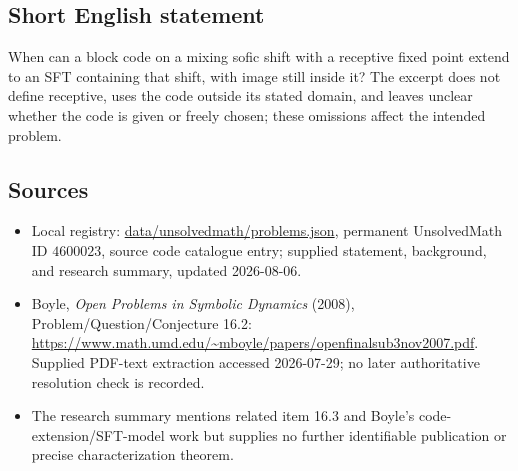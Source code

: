 \documentclass[11pt]{article}
\begin{document}
\subsection{Short English statement}
When can a block code on a mixing sofic shift with a receptive fixed point extend to an SFT containing that shift, with image still inside it? The excerpt does not define receptive, uses the code outside its stated domain, and leaves unclear whether the code is given or freely chosen; these omissions affect the intended problem.
\subsection{Sources}
\begin{itemize}
\item Local registry: \url{data/unsolvedmath/problems.json}, permanent UnsolvedMath ID \(4600023\), source code catalogue entry; supplied statement, background, and research summary, updated 2026-08-06.
\item Boyle, \emph{Open Problems in Symbolic Dynamics} (2008), Problem/Question/Conjecture 16.2: \url{https://www.math.umd.edu/~mboyle/papers/openfinalsub3nov2007.pdf}. Supplied PDF-text extraction accessed 2026-07-29; no later authoritative resolution check is recorded.
\item The research summary mentions related item 16.3 and Boyle's code-extension/SFT-model work but supplies no further identifiable publication or precise characterization theorem.
\end{itemize}
\end{document}

